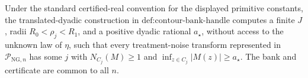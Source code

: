 Under the standard certified-real convention for the displayed primitive constants, the translated-dyadic construction in \(\text{def:contour-bank-handle}\) computes a finite \(J\), radii \(R_0<\rho_j<R_1\), and a positive dyadic rational \(a_{\star}\), without access to the unknown law of \(\eta\), such that every treatment-noise transform represented in \(\mathcal P_{\mathrm{NG},n}\) has some \(j\) with \(N_{C_j}(M)\ge1\) and \(\inf_{z\in C_j}|M(z)|\ge a_{\star}\).  The bank and certificate are common to all \(n\).